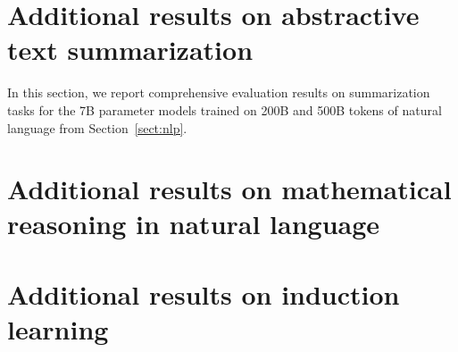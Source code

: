
\newpage
\section{Additional results on abstractive text summarization}
\label{app:summarzation_all}

In this section, we report comprehensive evaluation results on summarization tasks for the 7B parameter models trained on 200B and 500B tokens of natural language from Section~\ref{sect:nlp}.


\clearpage
\section{Additional results on mathematical reasoning in natural language}
\label{app:gsm8k}


\newpage
\section{Additional results on induction learning}
\label{app:induction}


\newpage
